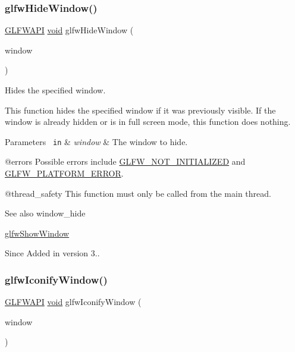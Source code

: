 \subsubsection{\texorpdfstring{glfwHideWindow()}{glfwHideWindow()}}
{\footnotesize\ttfamily \mbox{\hyperlink{glfw3_8h_a56da5036b2cc259351ae22fd6439bb47}{G\+L\+F\+W\+A\+PI}} \mbox{\hyperlink{glad_8h_a950fc91edb4504f62f1c577bf4727c29}{void}} glfw\+Hide\+Window (\begin{DoxyParamCaption}\item[{\mbox{\hyperlink{group__window_ga3c96d80d363e67d13a41b5d1821f3242}{G\+L\+F\+Wwindow}} $\ast$}]{window }\end{DoxyParamCaption})}



Hides the specified window. 

This function hides the specified window if it was previously visible. If the window is already hidden or is in full screen mode, this function does nothing.


\begin{DoxyParams}[1]{Parameters}
\mbox{\texttt{ in}}  & {\em window} & The window to hide.\\
\hline
\end{DoxyParams}
@errors Possible errors include \mbox{\hyperlink{group__errors_ga2374ee02c177f12e1fa76ff3ed15e14a}{G\+L\+F\+W\+\_\+\+N\+O\+T\+\_\+\+I\+N\+I\+T\+I\+A\+L\+I\+Z\+ED}} and \mbox{\hyperlink{group__errors_gad44162d78100ea5e87cdd38426b8c7a1}{G\+L\+F\+W\+\_\+\+P\+L\+A\+T\+F\+O\+R\+M\+\_\+\+E\+R\+R\+OR}}.

@thread\+\_\+safety This function must only be called from the main thread.

\begin{DoxySeeAlso}{See also}
window\+\_\+hide 

\mbox{\hyperlink{group__window_ga7945bcdff9e5e058cf36505d6873ed8c}{glfw\+Show\+Window}}
\end{DoxySeeAlso}
\begin{DoxySince}{Since}
Added in version 3.. 
\end{DoxySince}
\mbox{\label{group__window_ga24274e3c6ecd44e11fec5e6b66e4d7f3}} 
\subsubsection{\texorpdfstring{glfwIconifyWindow()}{glfwIconifyWindow()}}
{\footnotesize\ttfamily \mbox{\hyperlink{glfw3_8h_a56da5036b2cc259351ae22fd6439bb47}{G\+L\+F\+W\+A\+PI}} \mbox{\hyperlink{glad_8h_a950fc91edb4504f62f1c577bf4727c29}{void}} glfw\+Iconify\+Window (\begin{DoxyParamCaption}\item[{\mbox{\hyperlink{group__window_ga3c96d80d363e67d13a41b5d1821f3242}{G\+L\+F\+Wwindow}} $\ast$}]{window }\end{DoxyParamCaption})}



